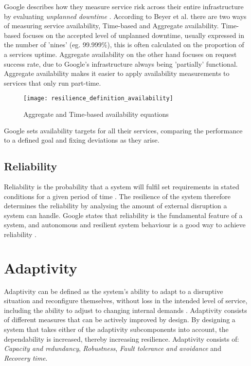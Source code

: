 Google describes how they measure service risk across their entire infrastructure by evaluating \textit{unplanned downtime}  \cite[p. 26]{beyer2016siteReliabilityEngineering}. According to Beyer et al. there are two ways of measuring service availability, Time-based and Aggregate availability. Time-based focuses on the accepted level of unplanned downtime, usually expressed in the number of 'nines' (eg. 99.999\%), this is often calculated on the proportion of a services uptime. Aggregate availability on the other hand focuses on request success rate, due to Google's infrastructure always being 'partially' functional. Aggregate availability makes it easier to apply availability measurements to services that only run part-time.

\begin{figure}[!htb]
  \texttt{[image: resilience\_definition\_availability]}  
  \caption{Aggregate and Time-based availability equations}
  \label{fig:resilience_definition_availability}
\end{figure}

Google sets availability targets for all their services, comparing the performance to a defined goal and fixing deviations as they arise.

\subsection{Reliability}
Reliability is the probability that a system will fulfil set requirements in stated conditions for a given period of time \cite{o2012practical}. The resilience of the system therefore determines the reliability by analysing the amount of external disruption a system can handle. Google states that reliability is the fundamental feature of a system, and autonomous and resilient system behaviour is a good way to achieve reliability \cite[p. 84]{beyer2016siteReliabilityEngineering}.

\section{Adaptivity}
Adaptivity can be defined as the system's ability to adapt to a disruptive situation and reconfigure themselves, without loss in the intended level of service, including the ability to adjust to changing internal demands \cite{reed2009methodology}. Adaptivity consists of different measures that can be actively improved by design. By designing a system that takes either of the adaptivity subcomponents into account, the dependability is increased, thereby increasing resilience. Adaptivity consists of: \textit{Capacity and redundancy}, \textit{Robustness}, \textit{Fault tolerance and avoidance} and \textit{Recovery time}.

